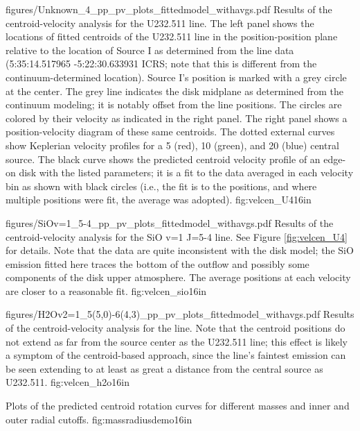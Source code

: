 \documentclass[twocolumn]{aastex61}
\begin{document}
\Figure
{figures/Unknown_4_pp_pv_plots_fittedmodel_withavgs.pdf}
{Results of the centroid-velocity analysis for the U232.511 line.
The left panel shows the locations of fitted centroids of the U232.511 line in
the position-position plane relative to the location of Source I as determined
from the line data (5:35:14.517965 -5:22:30.633931 ICRS; note that this is
different from the continuum-determined location).  Source I's position is
marked with a grey circle at the center.  The grey line indicates the disk
midplane as determined from the continuum modeling; it is notably offset from
the line positions.  The circles are colored by their velocity as indicated in
the right panel.  The right panel shows a position-velocity diagram of these
same centroids.  The dotted external curves show Keplerian velocity profiles
for a 5 (red), 10 (green), and 20 (blue) \msun central source.  The black
curve shows the predicted centroid velocity profile of an edge-on disk
with the listed parameters; it is a fit to the data averaged in each
velocity bin as shown with black circles (i.e., the fit is to the positions,
and where multiple positions were fit, the average was adopted).
}
{fig:velcen_U4}{1}{6in}

\Figure
{figures/SiOv=1_5-4_pp_pv_plots_fittedmodel_withavgs.pdf}
{Results of the centroid-velocity analysis for the SiO v=1 J=5-4 line.
See Figure \ref{fig:velcen_U4} for details.
Note that the data are quite inconsistent with the disk model;
the SiO emission fitted here traces the bottom of the outflow
and possibly some components of the disk upper atmosphere.
The average positions at each velocity are closer to a reasonable fit.
}
{fig:velcen_sio}{1}{6in}

\Figure
{figures/H2Ov2=1_5(5,0)-6(4,3)_pp_pv_plots_fittedmodel_withavgs.pdf}
{Results of the centroid-velocity analysis for the \water line.
Note that the centroid positions do not extend as far from
the source center as the U232.511 line; this effect is likely
a symptom of the centroid-based approach, since the \water
line's faintest emission can be seen extending to at least as great a distance
from the central source as U232.511.
}
{fig:velcen_h2o}{1}{6in}

{Plots of the predicted centroid rotation curves for different masses
and inner and outer radial cutoffs.}
{fig:massradiusdemo}{1}{6in}

\end{document}
